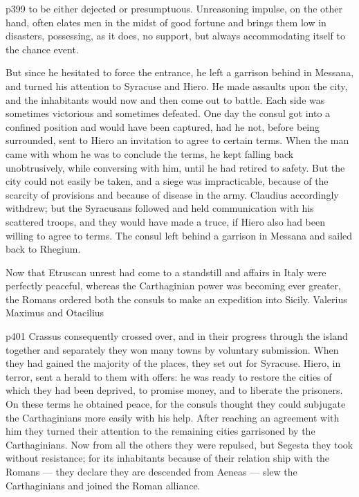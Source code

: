 p399 to be either dejected or presumptuous. Unreasoning impulse, on the other hand, often elates men in the midst of good fortune and brings them low in disasters, possessing, as it does, no support, but always accommodating itself to the chance event.

But since he hesitated to force the entrance, he left a garrison behind in Messana, and turned his attention to Syracuse and Hiero. He made assaults upon the city, and the inhabitants would now and then come out to battle. Each side was sometimes victorious and sometimes defeated. One day the consul got into a confined position and would have been captured, had he not, before being surrounded, sent to Hiero an invitation to agree to certain terms. When the man came with whom he was to conclude the terms, he kept falling back unobtrusively, while conversing with him, until he had retired to safety. But the city could not easily be taken, and a siege was impracticable, because of the scarcity of provisions and because of disease in the army. Claudius accordingly withdrew; but the Syracusans followed and held communication with his scattered troops, and they would have made a truce, if Hiero also had been willing to agree to terms. The consul left behind a garrison in Messana and sailed back to Rhegium.

Now that Etruscan unrest had come to a standstill and affairs in Italy were perfectly peaceful, whereas the Carthaginian power was becoming ever greater, the Romans ordered both the consuls to make an expedition into Sicily. Valerius Maximus and Otacilius

p401 Crassus consequently crossed over, and in their progress through the island together and separately they won many towns by voluntary submission. When they had gained the majority of the places, they set out for Syracuse. Hiero, in terror, sent a herald to them with offers: he was ready to restore the cities of which they had been deprived, to promise money, and to liberate the prisoners. On these terms he obtained peace, for the consuls thought they could subjugate the Carthaginians more easily with his help. After reaching an agreement with him they turned their attention to the remaining cities garrisoned by the Carthaginians. Now from all the others they were repulsed, but Segesta they took without resistance; for its inhabitants because of their relation ­ship with the Romans \texthebrew{—} they declare they are descended from Aeneas \texthebrew{—} slew the Carthaginians and joined the Roman alliance.

